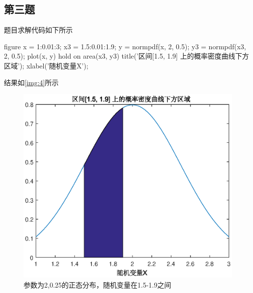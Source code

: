 \documentclass{article}
\begin{document}
\subsection{第三题}
题目求解代码如下所示
\begin{matlabcode}


    figure
    x = 1:0.01:3;
    x3 = 1.5:0.01:1.9;
    y = normpdf(x, 2, 0.5);
    y3 = normpdf(x3, 2, 0.5);
    plot(x, y) %
    hold on %
    area(x3, y3) %
    title('区间[1.5, 1.9] 上的概率密度曲线下方区域');
    xlabel('随机变量X');

\end{matlabcode}

结果如\autoref{img:4}所示
\begin{figure}[t]
\includegraphics[width=.5\textwidth]{4.eps}
\centering
\caption{参数为2,0.25的正态分布，随机变量在1.5-1.9之间} 
\label{img:4}
\end{figure}
\end{document}

